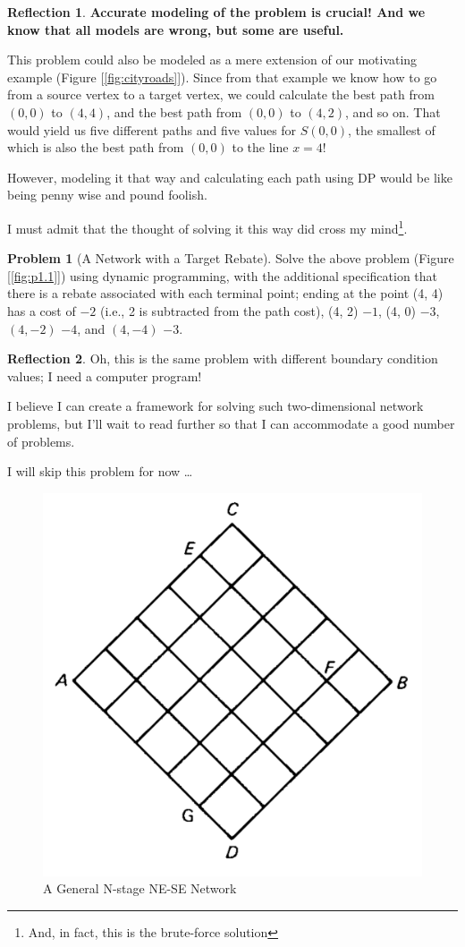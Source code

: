 \documentclass[english,notitlepage,smartquotes]{hgbreport}
\theoremstyle{definition}
\theoremstyle{definition}
\newtheorem{problem}{Problem}
\theoremstyle{remark}
\theoremstyle{definition}
\theoremstyle{plain}
\theoremstyle{definition}
\newtheorem{reflection}{Reflection}
\begin{document}
\begin{reflection}

\textbf{Accurate modeling of the problem is crucial! And we know that all models are wrong, but some are useful.}

This problem could also be modeled as a mere extension of our motivating example (Figure [\ref{fig:cityroads}]). Since from that example we know how to go from a source vertex to a target vertex, we could calculate the best path from $(0,0)$ to $(4,4)$, and the best path from $(0,0)$ to $(4,2)$, and so on. That would yield us five different paths and five values for $S(0,0)$, the smallest of which is also the best path from $(0,0)$ to the line $x=4$! 

However, modeling it that way and calculating each path using DP would be like being penny wise and pound foolish.

I must admit that the thought of solving it this way did cross my mind\footnote{And, in fact, this is the brute-force solution}.
\end{reflection}

\begin{problem}[A Network with a Target Rebate]
Solve the above problem (Figure [\ref{fig:p1.1}]) using dynamic programming, with the additional specification that there is a rebate associated with each terminal point; ending at the point (4, 4) has a cost of $-2$ (i.e., 2 is subtracted from the path cost), (4, 2) $-1$, (4, 0) $-3$, $(4, -2)$ $-4$, and $(4, -4)$ $-3$.
\end{problem}
\begin{reflection}
Oh, this is the same problem with different boundary condition values; I need a computer program!

I believe I can create a framework for solving such two-dimensional network problems, but I'll wait to read further so that I can accommodate a good number of problems.

I will skip this problem for now \dots
\end{reflection}


\begin{figure}[!h]
\begin{center}
\includegraphics[width=.345\textwidth]{p14-n-stage-nenw-network}
\caption{A General N-stage NE-SE Network}
\label{fig:general-network}
\end{center}
\end{figure}
\end{document}
